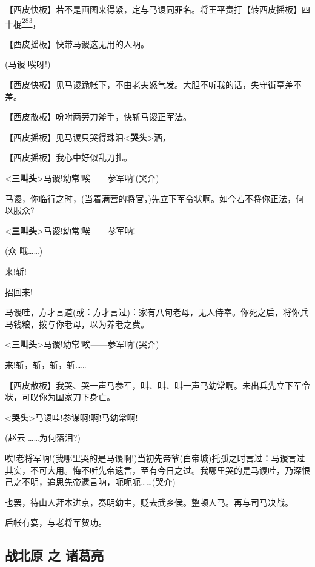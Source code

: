 【西皮快板】若不是画图来得紧，定与马谡同罪名。将王平责打【转西皮摇板】四十棍\protect\hyperlink{fn283}{\textsuperscript{283}}，

【西皮摇板】快带马谡这无用的人呐。

(马谡 唉呀!)

【西皮快板】见马谡跪帐下，不由老夫怒气发。大胆不听我的话，失守街亭差不差。

【西皮散板】吩咐两旁刀斧手，快斩马谡正军法。

【西皮摇板】见马谡只哭得珠泪\textless{}\textbf{哭头}\textgreater{}洒，

【西皮摇板】我心中好似乱刀扎。

\textless{}\textbf{三叫头}\textgreater{}马谡!幼常!唉------参军呐!(哭介)

马谡，你临行之时，(当着满营的将官，)先立下军令状啊。如今若不将你正法，何以服众?

\textless{}\textbf{三叫头}\textgreater{}马谡!幼常!唉------参军呐!

(众 哦\ldots{}\ldots{})

来!斩!

招回来!

马谡哇，方才言道(或：方才言过)：家有八旬老母，无人侍奉。你死之后，将你兵马钱粮，拨与你老母，以为养老之费。

\textless{}\textbf{三叫头}\textgreater{}马谡!幼常!唉------参军呐!(哭介)

来!斩，斩，斩，斩\ldots{}\ldots{}

【西皮散板】我哭、哭一声马参军，叫、叫、叫一声马幼常啊。未出兵先立下军令状，可叹你为国家刀下身亡。

\textless{}\textbf{哭头}\textgreater{}马谡哇!参谋啊!啊!马幼常啊!

(赵云 \ldots{}\ldots{}为何落泪?)

唉!老将军呐!(我哪里哭的是马谡啊!)当初先帝爷(白帝城)托孤之时言过：马谡言过其实，不可大用。悔不听先帝遗言，至有今日之过。我哪里哭的是马谡哇，乃深恨己之不明，追思先帝遗言呐，呃呃呃\ldots{}\ldots{}(哭介)

也罢，待山人拜本进京，奏明幼主，贬去武乡侯。整顿人马。再与司马决战。

后帐有宴，与老将军贺功。

\newpage
\hypertarget{ux6218ux5317ux539f-ux4e4b-ux8bf8ux845bux4eae}{%
\subsection{战北原 之
诸葛亮}\label{ux6218ux5317ux539f-ux4e4b-ux8bf8ux845bux4eae}}

